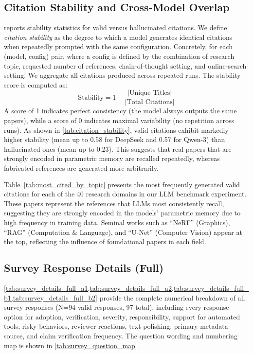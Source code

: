 


\subsection{Citation Stability and Cross-Model Overlap}

\label{app:stability_overlap}
 reports stability statistics for valid versus hallucinated citations.
We define \emph{citation stability} as the degree to which a model generates identical citations when repeatedly prompted with the same configuration.
Concretely, for each (model, config) pair, where a config is defined by the combination of research topic, requested number of references, chain-of-thought setting, and online-search setting. We aggregate all citations produced across repeated runs.
The stability score is computed as:
\[
\text{Stability} = 1 - \frac{|\text{Unique Titles}|}{|\text{Total Citations}|}
\]
A score of 1 indicates perfect consistency (the model always outputs the same papers), while a score of 0 indicates maximal variability (no repetition across runs).
As shown in \cref{tab:citation_stability}, valid citations exhibit markedly higher stability (mean up to 0.58 for DeepSeek and 0.57 for Qwen-3) than hallucinated ones (mean up to 0.23).
This suggests that real papers that are strongly encoded in parametric memory are recalled repeatedly, whereas fabricated references are generated more arbitrarily.

Table~\ref{tab:most_cited_by_topic} presents the most frequently generated valid citations for each of the 40 research domains in our LLM benchmark experiment.
These papers represent the references that LLMs most consistently recall, suggesting they are strongly encoded in the models' parametric memory due to high frequency in training data.
Seminal works such as ``NeRF'' (Graphics), ``RAG'' (Computation \& Language), and ``U-Net'' (Computer Vision) appear at the top, reflecting the influence of foundational papers in each field.

\subsection{Survey Response Details (Full)}
\label{app:survey_details_full}

\cref{tab:survey_details_full_a1,tab:survey_details_full_a2,tab:survey_details_full_b1,tab:survey_details_full_b2} provide the complete numerical breakdown of all survey responses (N=94 valid responses, 97 total), including every response option for adoption, verification, severity, responsibility, support for automated tools, risky behaviors, reviewer reactions, text polishing, primary metadata source, and claim verification frequency. The question wording and numbering map is shown in \cref{tab:survey_question_map}.









